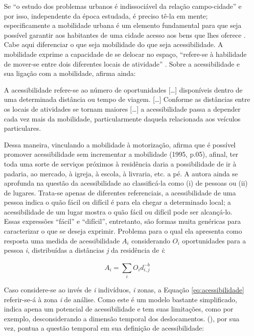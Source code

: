Se ``o estudo dos problemas urbanos é indissociável da relação campo-cidade'' \cite[p.154]{FREITAG2007} e por isso, independente da época estudada, é preciso tê-la em mente; especificamente a mobilidade urbana é um elemento fundamental para que seja possível garantir aos habitantes de uma cidade acesso aos bens que lhes oferece \cite{IEMA2010}. Cabe aqui diferenciar o que seja mobilidade do que seja acessibilidade. A mobilidade exprime a capacidade de se delocar no espaço, ``refere-se à habilidade de mover-se entre dois diferentes locais de atividade'' \cite[p.04]{HANSON1995a}.
Sobre a acessibilidade e sua ligação com a mobilidade,  afirma ainda:

\begin{citacao}
A acessibilidade refere-se ao número de oportunidades [\ldots] disponíveis dentro de uma determinada distância ou tempo de viagem. [\ldots] Conforme as distâncias entre os locais de atividades se tornam maiores [\ldots] a acessibilidade passa a depender cada vez mais da mobilidade, particularmente daquela relacionada aos veículos particulares. \cite[p.04]{HANSON1995a}
\end{citacao}

Dessa maneira, vinculando a mobilidade à motorização,  afirma que é possível promover acessibilidade sem incrementar a mobilidade (1995, p.05), afinal, ter toda uma sorte de serviços próximos à residência daria a possibilidade de ir à padaria, ao mercado, à igreja, à escola, à livraria, etc. a pé. A autora ainda se aprofunda na questão da acessibilidade ao classificá-la como (i) de pessoas ou (ii) de lugares. Trata-se apenas de diferentes referenciais, a acessibilidade de uma pessoa indica o quão fácil ou difícil é para ela chegar a determinado local; a acessibilidade de um lugar mostra o quão fácil ou difícil pode ser alcançá-lo. Essas expressões ``fácil'' e ``difícil'', entretanto, são formas muita genéricas para caracterizar o que se deseja exprimir. Problema para o qual ela apresenta como resposta uma medida de acessibilidade $A_{i}$ considerando $O_{i}$ oportunidades para a pessoa \emph{i}, distribuídas a distâncias \emph{j} da residência de \emph{i}:

\begin{equation}\label{eq:acessibilidade}
A_{i} = \sum_{i}^{} O_{i} d_{i,j}^ {-b}
\end{equation}

Caso considere-se ao invés de \emph{i} indivíduos, \emph{i} zonas, a Equação \ref{eq:acessibilidade} referir-se-á à zona \emph{i} de análise. Como este é um modelo bastante simplificado, indica apena um potencial de acessibilidade e tem suas limitações, como por exemplo, desconsiderando a dimensão temporal dos deslocamentos.
 (\citeyear{VASCONCELLOS2012}), por sua vez, pontua a questão temporal em sua definição de acessibilidade:

